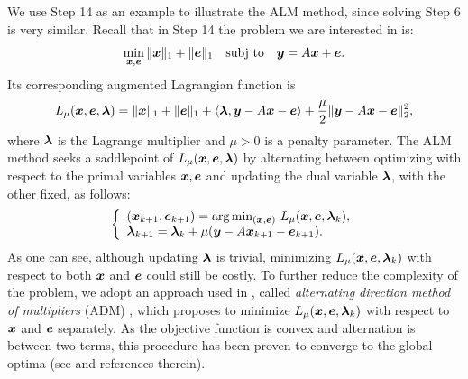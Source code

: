 \documentclass[12pt,journal,draftcls,letterpaper,onecolumn]{IEEEtran}
\newcommand{\subj}{\textup{subj to}}
\begin{document}
We use Step 14 as an example to illustrate the ALM
method, since solving Step 6 is very similar. Recall that in
Step 14 the problem we are interested in is:
\begin{equation}
\min_{\x, \e} \| \x \|_1 + \|\e\|_1 \quad \subj \quad \y =
A \x + \e.
\end{equation}
Its corresponding augmented Lagrangian function is
\begin{equation}
L_\mu ({\boldsymbol{x}},\boldsymbol{e},\boldsymbol{\lambda}) = \|{\boldsymbol{x}}\|_1 + \|\boldsymbol{e}\|_1 + \langle \boldsymbol{\lambda}, {\boldsymbol{y}}-A{\boldsymbol{x}} - \boldsymbol{e} \rangle + \frac{\mu}{2} \|{\boldsymbol{y}} - A{\boldsymbol{x}} - \boldsymbol{e}\|_2^2,
\end{equation}
where $\boldsymbol{\lambda}$ is the Lagrange multiplier and $\mu > 0$ is a
penalty parameter. The ALM method seeks a saddlepoint of $L_\mu
({\boldsymbol{x}},\boldsymbol{e},\boldsymbol{\lambda})$ by alternating between optimizing with respect
to the primal variables ${\boldsymbol{x}}, \boldsymbol{e}$ and updating the dual variable
$\boldsymbol{\lambda}$, with the other fixed, as follows:
\begin{equation}
\left \{
\begin{array}{lll}
(\x_{k+1},\e_{k+1})  =  \arg\min_{(\x,\e)} \, L_{\mu} (\x,\e,\blamda_k),\\
\blamda_{k+1}  =  \blamda_k + \mu (\y - A\x_{k+1} - \e_{k+1}). \\
\end{array}
\right .
\label{eq:alm}
\end{equation}
As one can see, although updating $\boldsymbol{\lambda}$ is trivial,
minimizing $L_{\mu} ({\boldsymbol{x}},\boldsymbol{e},\boldsymbol{\lambda}_k)$ with respect to both
${\boldsymbol{x}}$ and $\boldsymbol{e}$ could still be costly. To further reduce the
complexity of the problem, we adopt an approach used in
\cite{YangJ2009-pp}, called \emph{alternating direction
method of multipliers} (ADM) \cite{Glowinski1975-TR}, which proposes to minimize $L_{\mu} ({\boldsymbol{x}},\boldsymbol{e},\boldsymbol{\lambda}_k)$
with respect to ${\boldsymbol{x}}$ and $\boldsymbol{e}$ separately. As the objective function is convex and alternation is between two
terms, this procedure has been proven to converge to the global optima (see \cite{YangJ2009-pp} and references therein). 
\end{document}
